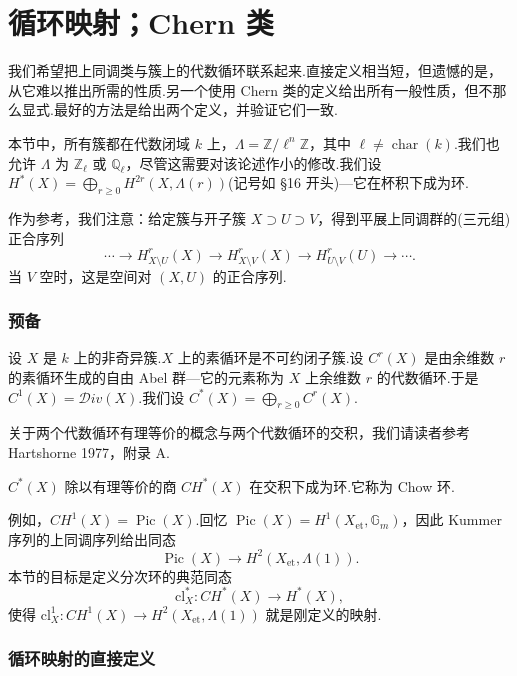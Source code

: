 ﻿%
\chapter{循环映射；Chern 类}\label{sec:23}

我们希望把上同调类与簇上的代数循环联系起来.直接定义相当短，但遗憾的是，从它难以推出所需的性质.另一个使用 Chern 类的定义给出所有一般性质，但不那么显式.最好的方法是给出两个定义，并验证它们一致.

本节中，所有簇都在代数闭域 $k$ 上，$\Lambda = \mathbb{Z}/\ell^{n}\mathbb{Z}$，其中 $\ell \neq \operatorname{char}(k)$.我们也允许 $\Lambda$ 为 $\mathbb{Z}_{\ell}$ 或 $\mathbb{Q}_{\ell}$，尽管这需要对该论述作小的修改.我们设 $H^{*}(X) = \bigoplus_{r \geq 0} H^{2r}(X, \Lambda(r))$(记号如 \S 16 开头)---它在杯积下成为环.

作为参考，我们注意：给定簇与开子簇 $X \supset U \supset V$，得到平展上同调群的(三元组)正合序列
\[
\cdots \to H^{r}_{X \setminus U}(X) \to H^{r}_{X \setminus V}(X) \to H^{r}_{U \setminus V}(U) \to \cdots.
\]
当 $V$ 空时，这是空间对 $(X, U)$ 的正合序列.

\subsection*{预备}

设 $X$ 是 $k$ 上的非奇异簇.$X$ 上的素循环是不可约闭子簇.设 $C^{r}(X)$ 是由余维数 $r$ 的素循环生成的自由 Abel 群---它的元素称为 $X$ 上余维数 $r$ 的代数循环.于是 $C^{1}(X) = \mathcal{D}iv(X)$.我们设 $C^{*}(X) = \bigoplus_{r \geq 0} C^{r}(X)$.

关于两个代数循环有理等价的概念与两个代数循环的交积，我们请读者参考 Hartshorne 1977，附录 A.

$C^{*}(X)$ 除以有理等价的商 $CH^{*}(X)$ 在交积下成为环.它称为 Chow 环.

例如，$CH^{1}(X) = \operatorname{Pic}(X)$.回忆 $\operatorname{Pic}(X) = H^{1}(X_{\mathrm{et}}, \mathbb{G}_{m})$，因此 Kummer 序列的上同调序列给出同态
\[
\operatorname{Pic}(X) \to H^{2}(X_{\mathrm{et}}, \Lambda(1)).
\]
本节的目标是定义分次环的典范同态
\[
\mathrm{cl}^{*}_{X} \colon CH^{*}(X) \to H^{*}(X),
\]
使得 $\mathrm{cl}^{1}_{X} \colon CH^{1}(X) \to H^{2}(X_{\mathrm{et}}, \Lambda(1))$ 就是刚定义的映射.

\subsection*{循环映射的直接定义}


